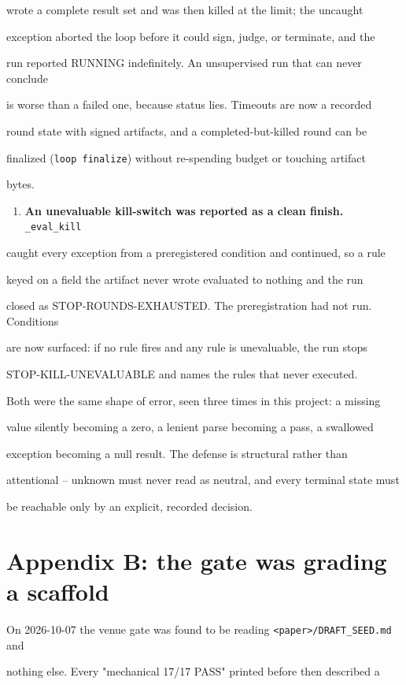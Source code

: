 \documentclass[11pt]{article}
\begin{document}
wrote a complete result set and was then killed at the limit; the uncaught

exception aborted the loop before it could sign, judge, or terminate, and the

run reported RUNNING indefinitely. An unsupervised run that can never conclude

is worse than a failed one, because status lies. Timeouts are now a recorded

round state with signed artifacts, and a completed-but-killed round can be

finalized (\texttt{loop finalize}) without re-spending budget or touching artifact

bytes.

\begin{enumerate}\item {\bf An unevaluable kill-switch was reported as a clean finish.} \texttt{\_eval\_kill}
\end{enumerate}
caught every exception from a preregistered condition and continued, so a rule

keyed on a field the artifact never wrote evaluated to nothing and the run

closed as STOP-ROUNDS-EXHAUSTED. The preregistration had not run. Conditions

are now surfaced: if no rule fires and any rule is unevaluable, the run stops

STOP-KILL-UNEVALUABLE and names the rules that never executed.


Both were the same shape of error, seen three times in this project: a missing

value silently becoming a zero, a lenient parse becoming a pass, a swallowed

exception becoming a null result. The defense is structural rather than

attentional -- unknown must never read as neutral, and every terminal state must

be reachable only by an explicit, recorded decision.


\section*{Appendix B: the gate was grading a scaffold}

On 2026-10-07 the venue gate was found to be reading \texttt{<paper>/DRAFT\_SEED.md} and

nothing else. Every "mechanical 17/17 PASS" printed before then described a
\end{document}
